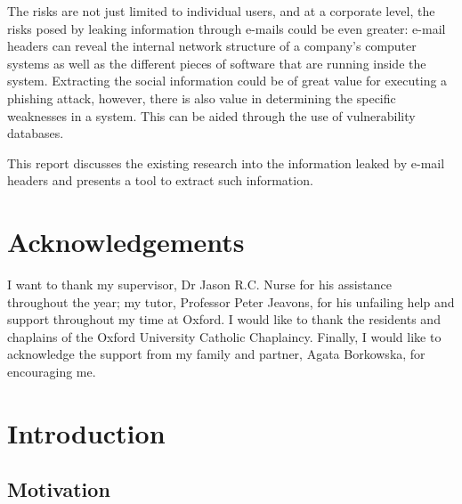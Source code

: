 \documentclass[a4paper,DIV=11,BCOR=7mm,abstract=yes,twoside,10pt]{scrreprt}
\begin{document}
The risks are not just limited to individual users, and at a corporate
level, the risks posed by leaking information through e-mails could be even
greater: e-mail headers can reveal the internal network structure of a
company's computer systems as well as the different pieces of software that
are running inside the system.  Extracting the social information could be
of great value for executing a phishing attack, however, there is also value
in determining the specific weaknesses in a system.  This can be aided
through the use of vulnerability databases.

This report discusses the existing research into the information leaked by
e-mail headers and presents a tool to extract such information.

\chapter*{Acknowledgements}

I want to thank my supervisor, Dr Jason R.C. Nurse for his assistance
throughout the year; my tutor, Professor Peter Jeavons, for his unfailing
help and support throughout my time at Oxford.  I would like to thank the
residents and chaplains of the Oxford University Catholic Chaplaincy.
Finally, I would like to acknowledge the support from my family and
partner, Agata Borkowska, for encouraging me.

\tableofcontents 
\let\LaTeXStandardClearpage\clearpage
\let\clearpage\relax  %

\listoftables \listoffigures \listofalgorithms

\let\clearpage\LaTeXStandardClearpage %


\chapter{Introduction}
\setcounter{page}{1}

\section{Motivation}
\end{document}
